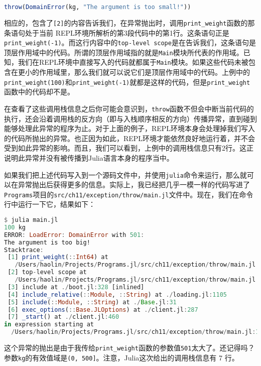 \begin{lstlisting}[language=julia]
throw(DomainError(kg, "The argument is too small!"))
\end{lstlisting}

相应的，包含了\verb|[2]|的内容告诉我们，在异常抛出时，调用\verb|print_weight|函数的那条语句处于当前 REPL环境所解析的第3段代码中的第1行。这条语句正是\verb|print_weight(-1)|。而这行内容中的\verb|top-level scope|是在告诉我们，这条语句是顶层作用域中的代码。所谓的顶层作用域指的就是\verb|Main|模块所代表的作用域。已知，我们在REPL环境中直接写入的代码就都属于\verb|Main|模块。如果这些代码未被包含在更小的作用域里，那么我们就可以说它们是顶层作用域中的代码。上例中的\verb|print_weight(100)|和\verb|print_weight(-1)|就都是这样的代码，但是\verb|print_weight|函数中的代码却不是。

在查看了这些调用栈信息之后你可能会意识到，\verb|throw|函数不但会中断当前代码的执行，还会沿着调用栈的反方向（即与入栈顺序相反的方向）传播异常，直到碰到能够处理此异常的程序为止。对于上面的例子，REPL环境本身会处理掉我们写入的代码所抛出的异常。也正因为如此，REPL环境才能依然良好地运行着，并不会受到如此异常的影响。而且，我们可以看到，上例中的调用栈信息只有2行。这正说明此异常并没有被传播到Julia语言本身的程序当中。

如果我们把上述代码写入到一个源码文件中，并使用\verb|julia|命令来运行，那么就可以在异常抛出后获得更多的信息。实际上，我已经把几乎一模一样的代码写进了\verb|Programs|项目的\verb|src/ch11/exception/throw/main.jl|文件中。现在，我们在命令行中运行一下它，结果如下：

\begin{lstlisting}[language=julia]
$ julia main.jl 
100 kg
ERROR: LoadError: DomainError with 501:
The argument is too big!
Stacktrace:
 [1] print_weight(::Int64) at 
   /Users/haolin/Projects/Programs.jl/src/ch11/exception/throw/main.jl:11
 [2] top-level scope at 
   /Users/haolin/Projects/Programs.jl/src/ch11/exception/throw/main.jl:17
 [3] include at ./boot.jl:328 [inlined]
 [4] include_relative(::Module, ::String) at ./loading.jl:1105
 [5] include(::Module, ::String) at ./Base.jl:31
 [6] exec_options(::Base.JLOptions) at ./client.jl:287
 [7] _start() at ./client.jl:460
in expression starting at 
  /Users/haolin/Projects/Programs.jl/src/ch11/exception/throw/main.jl:17
\end{lstlisting}

这个异常的抛出是由于我传给\verb|print_weight|函数的参数值\verb|501|太大了。还记得吗？参数\verb|kg|的有效值域是\verb|(0, 500]|。注意，Julia这次给出的调用栈信息有 7 行。

